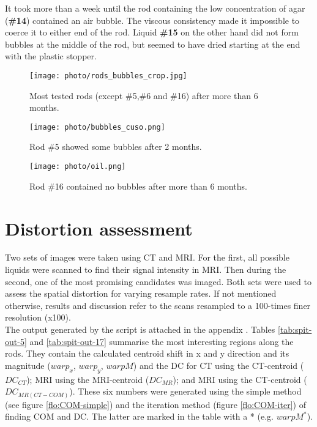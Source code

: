 It took more than a week until the rod containing the low concentration of agar (\textbf{\#14}) contained an air bubble.
The viscous consistency made it impossible to coerce it to either end of the rod.
Liquid \textbf{\#15} on the other hand did not form bubbles at the middle of the rod, but seemed to have dried starting at the end with the plastic stopper.

\begin{figure}[tbh!]
\centering
\texttt{[image: photo/rods\_bubbles\_crop.jpg]}
\caption{Most tested rods (except \#5,\#6 and \#16) after more than 6 months.}
\label{fig:bubbles}
\end{figure}


\begin{figure}[tbh!]
\centering
\texttt{[image: photo/bubbles\_cuso.png]}
\caption{Rod \#5 showed some bubbles after 2 months.}
\label{fig:bubbles_cuso}
\end{figure}

\begin{figure}[tbh!]
\centering
\texttt{[image: photo/oil.png]}
\caption{Rod \#16 contained no bubbles after more than 6 months.}
\label{fig:bubbles_oil}
\end{figure}

\section{Distortion assessment}

Two sets of images were taken using CT and MRI.
For the first, all possible liquids were scanned to find their signal intensity in MRI.
Then during the second, one of the most promising candidates was imaged.
Both sets were used to assess the spatial distortion for varying resample rates.
If not mentioned otherwise, results and discussion refer to the scans resampled to a 100-times finer resolution (x100). \\

The output generated by the script is attached in the appendix .
Tables \ref{tab:spit-out-5} and \ref{tab:spit-out-17} summarise the most interesting regions along the rods.
They contain the calculated centroid shift in x and y direction and its magnitude ($warp_x$, $warp_y$, $warpM$) and the DC for CT using the CT-centroid ($DC_{CT}$); MRI using the MRI-centroid ($DC_{MR}$); and MRI using the CT-centroid ($DC_{MR(CT-COM)}$).
These six numbers were generated using the simple method (see figure \ref{flo:COM-simple}) and the iteration method (figure \ref{flo:COM-iter}) of finding COM and DC.
The latter are marked in the table with a * (e.g. $warpM^*$).

